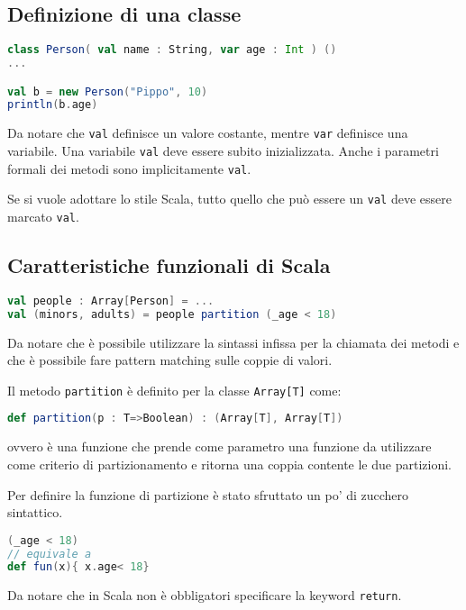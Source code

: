 \subsection{Definizione di una classe}

\begin{lstlisting}[language=Scala, caption=Definizione di una classe; non serve esplicitare il costruttore]
class Person( val name : String, var age : Int ) ()
...

val b = new Person("Pippo", 10)
println(b.age)
\end{lstlisting}

Da notare che \texttt{val} definisce un valore costante, mentre \texttt{var} definisce una variabile. Una variabile \texttt{val} deve essere subito inizializzata.
Anche i parametri formali dei metodi sono implicitamente \texttt{val}.

Se si vuole adottare lo stile Scala, tutto quello che può essere un \texttt{val} deve essere marcato \texttt{val}.


\subsection{Caratteristiche funzionali di Scala}

\begin{lstlisting}[language=Scala, caption=Caratteristiche funzionali di Scala]
val people : Array[Person] = ...
val (minors, adults) = people partition (_age < 18)
\end{lstlisting}

Da notare che è possibile utilizzare la sintassi infissa per la chiamata dei metodi e che è possibile fare pattern matching sulle coppie di valori.

Il metodo \texttt{partition} è definito per la classe \texttt{Array[T]} come:

\begin{lstlisting}[language=Scala]
def partition(p : T=>Boolean) : (Array[T], Array[T])
\end{lstlisting}

ovvero è una funzione che prende come parametro una funzione da utilizzare come criterio di partizionamento e ritorna una coppia contente le due partizioni.

Per definire la funzione di partizione è stato sfruttato un po' di zucchero sintattico.

\begin{lstlisting}[language=Scala, caption=Definzione di una funzione anonima.]
(_age < 18)
// equivale a 
def fun(x){ x.age< 18}
\end{lstlisting}

Da notare che in Scala non è obbligatori specificare la keyword \texttt{return}.












